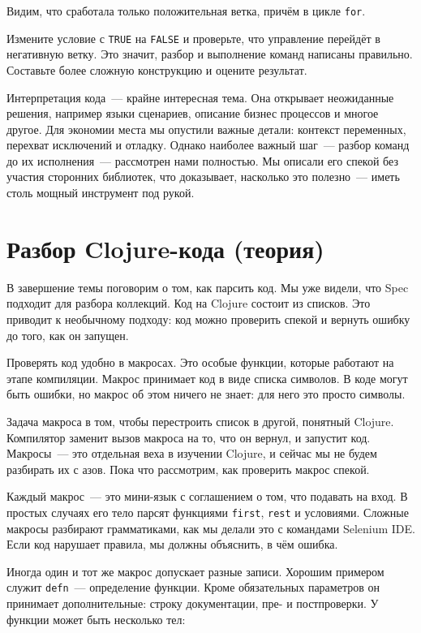 Видим, что сработала только положительная ветка, причём в цикле
\texttt{for}.

Измените условие с \verb|TRUE| на \verb|FALSE| и проверьте, что управление
перейдёт в негативную ветку. Это значит, разбор и выполнение команд написаны
правильно. Составьте более сложную конструкцию и оцените результат.

Интерпретация кода~--- крайне интересная тема. Она открывает неожиданные
решения, например языки сценариев, описание бизнес процессов и многое
другое. Для экономии места мы опустили важные детали: контекст переменных,
перехват исключений и отладку. Однако наиболее важный шаг~--- разбор команд до
их исполнения~--- рассмотрен нами полностью. Мы описали его спекой без участия
сторонних библиотек, что доказывает, насколько это полезно~--- иметь столь
мощный инструмент под рукой.

\section{Разбор Clojure-кода (теория)}


В завершение темы поговорим о том, как парсить код. Мы уже видели, что Spec
подходит для разбора коллекций. Код на Clojure состоит из списков. Это приводит
к необычному подходу: код можно проверить спекой и вернуть ошибку до того, как
он запущен.

Проверять код удобно в макросах. Это особые функции, которые работают на этапе
компиляции. Макрос принимает код в виде списка символов. В коде могут быть
ошибки, но макрос об этом ничего не знает: для него это просто символы.

Задача макроса в том, чтобы перестроить список в другой, понятный
Clojure. Компилятор заменит вызов макроса на то, что он вернул, и запустит
код. Макросы~--- это отдельная веха в изучении Clojure, и сейчас мы не будем
разбирать их с азов. Пока что рассмотрим, как проверить макрос спекой.

Каждый макрос~--- это мини-язык с соглашением о том, что подавать на вход. В
простых случаях его тело парсят функциями \verb|first|, \verb|rest| и
условиями. Сложные макросы разбирают грамматиками, как мы делали это с командами
Selenium IDE. Если код нарушает правила, мы должны объяснить, в чём ошибка.

Иногда один и тот же макрос допускает разные записи. Хорошим примером служит
\verb|defn|~--- определение функции. Кроме обязательных параметров он принимает
дополнительные: строку документации, пре- и постпроверки. У функции может быть
несколько тел:

